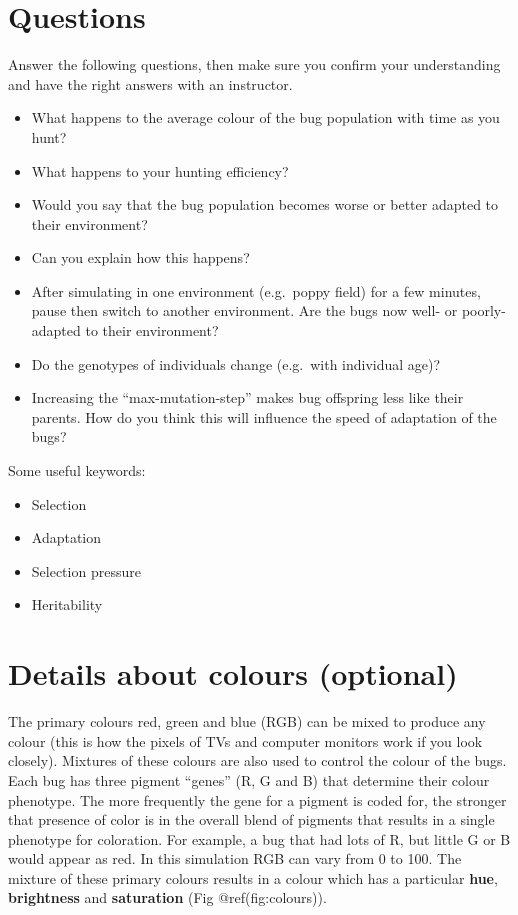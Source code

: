 \documentclass[
  a4paper]{book}
\providecommand{\tightlist}{%
  \setlength{\itemsep}{0pt}\setlength{\parskip}{0pt}}
\begin{document}
\hypertarget{questions}{%
\section{Questions}\label{questions}}

Answer the following questions, then make sure you confirm your
understanding and have the right answers with an instructor.

\begin{itemize}
\tightlist
\item
  What happens to the average colour of the bug population with time as
  you hunt?
\item
  What happens to your hunting efficiency?
\item
  Would you say that the bug population becomes worse or better adapted
  to their environment?
\item
  Can you explain how this happens?
\item
  After simulating in one environment (e.g.~poppy field) for a few
  minutes, pause then switch to another environment. Are the bugs now
  well- or poorly-adapted to their environment?
\item
  Do the genotypes of individuals change (e.g.~with individual age)?
\item
  Increasing the ``max-mutation-step'' makes bug offspring less like
  their parents. How do you think this will influence the speed of
  adaptation of the bugs?
\end{itemize}

Some useful keywords:

\begin{itemize}
\tightlist
\item
  Selection
\item
  Adaptation
\item
  Selection pressure
\item
  Heritability
\end{itemize}

\hypertarget{details-about-colours-optional}{%
\section{Details about colours
(optional)}\label{details-about-colours-optional}}

The primary colours red, green and blue (RGB) can be mixed to produce
any colour (this is how the pixels of TVs and computer monitors work if
you look closely). Mixtures of these colours are also used to control
the colour of the bugs. Each bug has three pigment ``genes'' (R, G and
B) that determine their colour phenotype. The more frequently the gene
for a pigment is coded for, the stronger that presence of color is in
the overall blend of pigments that results in a single phenotype for
coloration. For example, a bug that had lots of R, but little G or B
would appear as red. In this simulation RGB can vary from 0 to 100. The
mixture of these primary colours results in a colour which has a
particular \textbf{hue}, \textbf{brightness} and \textbf{saturation}
(Fig @ref(fig:colours)).
\end{document}
